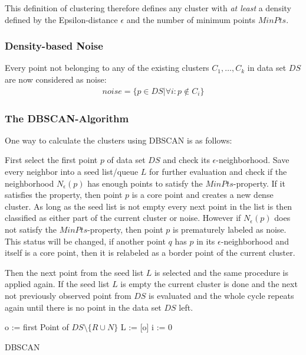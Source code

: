 This definition of clustering therefore defines any cluster with \textit{at least} a density defined by the Epsilon-distance $\epsilon$ and the number of minimum points $MinPts$.

\subsubsection*{Density-based Noise}
Every point not belonging to any of the existing clusters $C_1, \dotsc, C_k$ in data set $DS$ are now considered as noise: 
\begin{align}
    noise = \{p \in  DS | \forall i : p \notin C_i\}
\end{align}

\subsubsection*{The DBSCAN-Algorithm}
One way to calculate the clusters using DBSCAN is as follows:

First select the first point $p$ of data set $DS$ and check its $\epsilon$-neighborhood. Save every neighbor into a seed list/queue $L$ for further evaluation and check if the neighborhood $N_{\epsilon}(p)$ has enough points to satisfy the $MinPts$-property. 
If it satisfies the property, then point $p$ is a core point and creates a new dense cluster. As long as the seed list is not empty every next point in the list is then classified as either part of the current cluster or noise.
However if $N_{\epsilon}(p)$ does not satisfy the $MinPts$-property, then point $p$ is prematurely labeled as noise. This status will be changed, if another point $q$ has $p$ in its $\epsilon$-neighborhood and itself is a core point, then it is relabeled as a border point of the current cluster.

Then the next point from the seed list $L$ is selected and the same procedure is applied again.
If the seed list $L$ is empty the current cluster is done and the next not previously observed point from $DS$ is evaluated and the whole cycle repeats again until there is no point in the data set $DS$ left.

\vspace{5mm}
\begin{algorithm}[H]
\SetAlgoLined
{}
 o := first Point of $DS\setminus \{R \cup N\}$\;
 L := [o]\;
 i := 0\;
 \caption{DBSCAN}
\end{algorithm}
\vspace{5mm}

